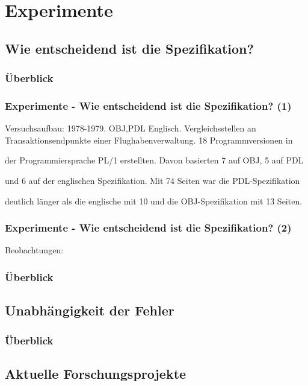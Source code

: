 \section{Experimente}
%
\subsection{Wie entscheidend ist die Spezifikation?}
%
%
\begin{frame}
	\frametitle{Überblick}
	\tableofcontents[currentsubsection]
\end{frame}
%
\begin{frame}
	\frametitle{Experimente - Wie entscheidend ist die Spezifikation? (1)}
	Versuchsaufbau:
	1978-1979. OBJ,PDL Englisch. Vergleichsstellen an Transaktionsendpunkte einer Flughabenverwaltung.
	18 Programmversionen in

der Programmiersprache PL/1 erstellten. Davon basierten 7 auf OBJ, 5 auf PDL

und 6 auf der englischen Spezifikation. Mit 74 Seiten war die PDL-Spezifikation

deutlich länger als die englische mit 10 und die OBJ-Spezifikation mit 13 Seiten.

\end{frame}
%
\begin{frame}
	\frametitle{Experimente - Wie entscheidend ist die Spezifikation? (2)}
	Beobachtungen:
	
\end{frame}
%
%
\begin{frame}
	\frametitle{Überblick}
	\tableofcontents[currentsubsection]
\end{frame}
%
\subsection{Unabhängigkeit der Fehler}
%
\begin{frame}
	\frametitle{Überblick}
	\tableofcontents[currentsubsection]
\end{frame}
%
\subsection{Aktuelle Forschungsprojekte}